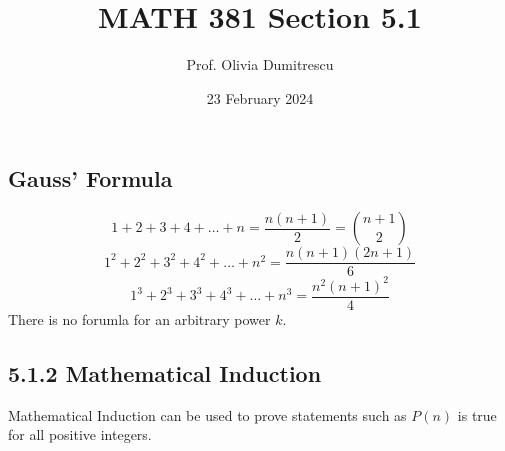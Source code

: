 \documentclass[letterpaper, 12pt]{article}
\title{MATH 381 Section 5.1}
\author{Prof. Olivia Dumitrescu}
\date{23 February 2024}
\newcommand{\0}{\emptyset}
\begin{document}
    \maketitle
    \subsection*{Gauss' Formula}
    \[1 + 2 + 3 + 4 + \dots + n = \frac{n(n + 1)}{2} = \binom{n+1}{2}\]
    \[1^2 + 2^2 + 3^2 + 4^2 + \dots + n^2 = \frac{n(n + 1)(2n + 1)}{6}\]
    \[1^3 + 2^3 + 3^3 + 4^3 + \dots + n^3 = \frac{n^2(n + 1)^2}{4}\]
    There is no forumla for an arbitrary power $k$.
    \subsection*{5.1.2 Mathematical Induction}
    Mathematical Induction can be used to prove statements such as $P(n)$ is true for all 
    positive integers.
\end{document}

